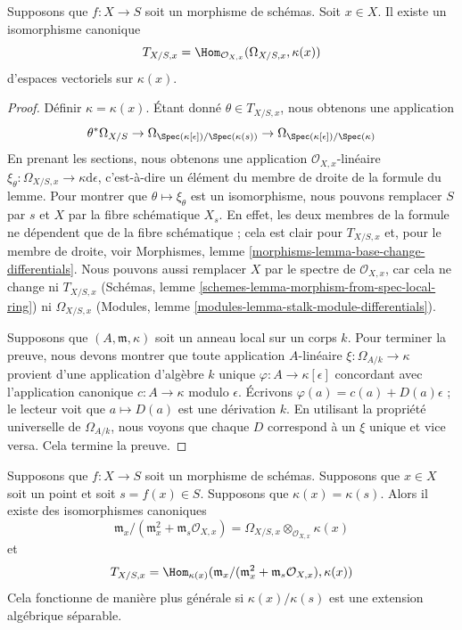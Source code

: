 \begin{lemma}
\label{lemma-tangent-space-cotangent-space}
Supposons que $f : X \to S$ soit un morphisme de
schémas. Soit $x \in X$. Il existe un isomorphisme canonique
$$
T_{X/S, x} = \Hom_{\mathcal{O}_{X, x}}(\Omega_{X/S, x}, \kappa(x))
$$
d'espaces vectoriels sur $\kappa(x)$.
\end{lemma}

\begin{proof}
Définir $\kappa = \kappa(x)$. Étant donné
$\theta \in T_{X/S, x}$, nous obtenons une application
$$
\theta^*\Omega_{X/S} \to
\Omega_{\Spec(\kappa[\epsilon])/\Spec(\kappa(s))} \to
\Omega_{\Spec(\kappa[\epsilon])/\Spec(\kappa)}
$$
En prenant les sections, nous obtenons une application
$\mathcal{O}_{X, x}$-linéaire $\xi_\theta : \Omega_{X/S, x}
\to \kappa \text{d}\epsilon$, c'est-à-dire un élément du
membre de droite de la formule du lemme. Pour montrer que
$\theta \mapsto \xi_\theta$ est un isomorphisme, nous
pouvons remplacer $S$ par $s$ et $X$ par la fibre schématique
$X_s$. En effet, les deux membres de la formule ne dépendent
que de la fibre schématique ; cela est clair pour $T_{X/S,
x}$ et, pour le membre de droite, voir Morphismes, lemme
\ref{morphisms-lemma-base-change-differentials}. Nous pouvons
aussi remplacer $X$ par le spectre de $\mathcal{O}_{X, x}$,
car cela ne change ni $T_{X/S, x}$ (Schémas, lemme
\ref{schemes-lemma-morphism-from-spec-local-ring}) ni $\Omega_{X/S,
x}$ (Modules, lemme \ref{modules-lemma-stalk-module-differentials}).

\medskip\noindent
Supposons que $(A, \mathfrak m, \kappa)$ soit un anneau local sur un
corps $k$. Pour terminer la preuve, nous devons montrer que toute
application $A$-linéaire $\xi : \Omega_{A/k} \to \kappa$ provient
d'une application d'algèbre $k$ unique $\varphi : A \to
\kappa[\epsilon]$ concordant avec l'application canonique $c : A \to
\kappa$ modulo $\epsilon$. Écrivons $\varphi(a) = c(a) + D(a) \epsilon$
; le lecteur voit que $a \mapsto D(a)$ est une dérivation $k$. En
utilisant la propriété universelle de $\Omega_{A/k}$, nous voyons que
chaque $D$ correspond à un $\xi$ unique et vice versa. Cela termine la preuve.
\end{proof}

\begin{lemma}
\label{lemma-tangent-space-rational-point}
Supposons que $f : X \to S$ soit un morphisme de schémas. Supposons
que $x \in X$ soit un point et soit $s = f(x) \in S$. Supposons que
$\kappa(x) = \kappa(s)$. Alors il existe des isomorphismes canoniques
$$
\mathfrak m_x/(\mathfrak m_x^2 + \mathfrak m_s\mathcal{O}_{X, x})
=
\Omega_{X/S, x} \otimes_{\mathcal{O}_{X, x}} \kappa(x)
$$
et
$$
T_{X/S, x} =
\Hom_{\kappa(x)}(
\mathfrak m_x/(\mathfrak m_x^2 + \mathfrak m_s\mathcal{O}_{X, x}),
\kappa(x))
$$
Cela fonctionne de manière plus générale si
$\kappa(x)/\kappa(s)$ est une extension algébrique séparable.
\end{lemma}

